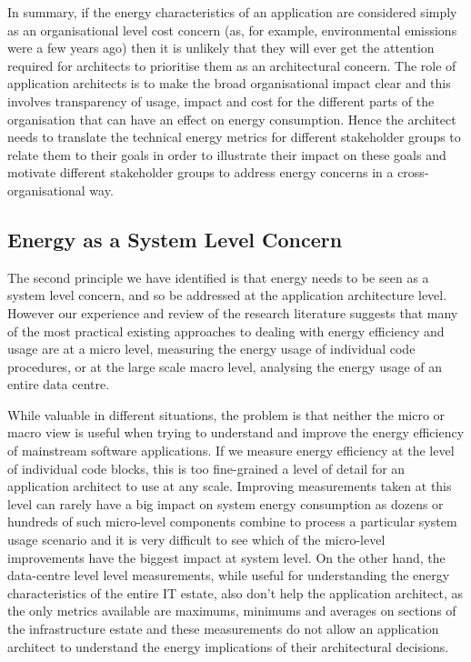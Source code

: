 In summary, if the energy characteristics of an application are considered simply as an organisational level cost concern (as, for example, environmental emissions were a few years ago) then it is unlikely that they will ever get the attention required for architects to prioritise them as an architectural concern.  The role of application architects is to make the broad organisational impact clear and this involves transparency of usage, impact and cost for the different parts of the organisation that can have an effect on energy consumption.  Hence the architect needs to translate the technical energy metrics for different stakeholder groups to relate them to their goals in order to illustrate their impact on these goals and motivate different stakeholder groups to address energy concerns in a cross-organisational way. 

\subsection{Energy as a System Level Concern}

The second principle we have identified is that energy needs to be seen as a system level concern, and so be addressed at the application architecture level.  However our experience and review of the research literature suggests that many of the most practical existing approaches to dealing with energy efficiency and usage are at a micro level, measuring the energy usage of individual code procedures, or at the large scale macro level, analysing the energy usage of an entire data centre.  

While valuable in different situations, the problem is that neither the micro or macro view is useful when trying to understand and improve the energy efficiency of mainstream software applications.  If we measure energy efficiency at the level of individual code blocks, this is too fine-grained a level of detail for an application architect to use at any scale.  Improving measurements taken at this level can rarely have a big impact on system energy consumption as dozens or hundreds of such micro-level components combine to process a particular system usage scenario and it is very difficult to see which of the micro-level improvements have the biggest impact at system level.  On the other hand, the data-centre level level measurements, while useful for understanding the energy characteristics of the entire IT estate, also don't help the application architect, as the only metrics available are maximums, minimums and averages on sections of the infrastructure estate and these measurements do not allow an application architect to understand the energy implications of their architectural decisions.

